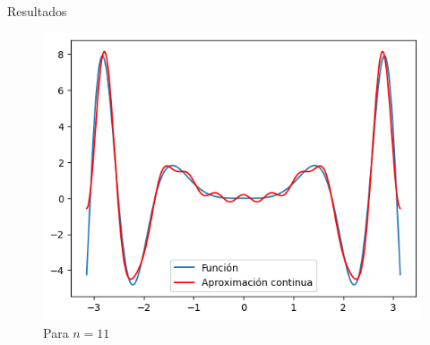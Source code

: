\begin{frame}{Resultados}
    \begin{figure}
        \centering
        \includegraphics[width=.75\paperwidth]{p13-A-cont3.png}
        \caption{Para $n=11$}
    \end{figure}
\end{frame}